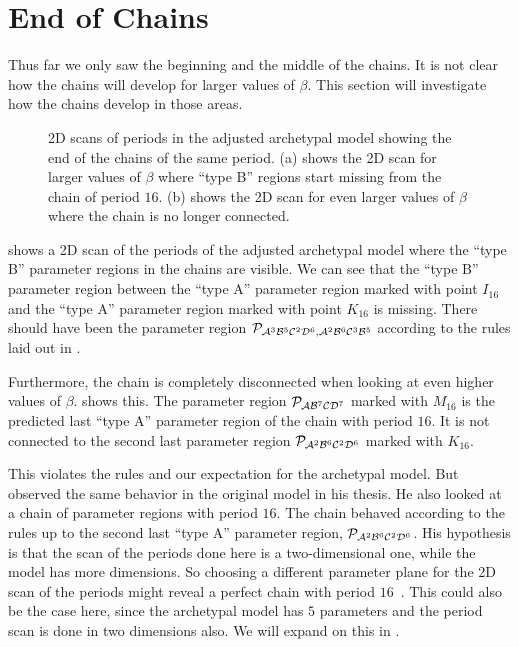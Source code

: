 \section{End of Chains}
\label{sec:arch.end}

Thus far we only saw the beginning and the middle of the chains.
It is not clear how the chains will develop for larger values of $\beta$.
This section will investigate how the chains develop in those areas.

\begin{figure}
	\centering
	\caption[2D scans of periods in the archetypal model showing the end of the chains]{
		2D scans of periods in the adjusted archetypal model showing the end of the chains of the same period.
		(a) shows the 2D scan for larger values of $\beta$ where ``type B'' regions start missing from the chain of period $16$.
		(b) shows the 2D scan for even larger values of $\beta$ where the chain is no longer connected.
	}
\end{figure}

 shows a 2D scan of the periods of the adjusted archetypal model where the ``type B'' parameter regions in the chains are visible.
We can see that the ``type B'' parameter region between the ``type A'' parameter region marked with point $I_{16}$ and the ``type A'' parameter region marked with point $K_{16}$ is missing.
There should have been the parameter region $\mathcal{P}_{\mathcal{A}^3\mathcal{B}^5\mathcal{C}^2\mathcal{D}^6, \mathcal{A}^2\mathcal{B}^6\mathcal{C}^3\mathcal{B}^5}$ according to the rules laid out in .

Furthermore, the chain is completely disconnected when looking at even higher values of $\beta$.
 shows this.
The parameter region $\mathcal{P}_{\mathcal{A}\mathcal{B}^7\mathcal{C}\mathcal{D}^7}$ marked with $M_{16}$ is the predicted last ``type A'' parameter region of the chain with period $16$.
It is not connected to the second last parameter region $\mathcal{P}_{\mathcal{A}^2\mathcal{B}^6\mathcal{C}^2\mathcal{D}^6}$ marked with $K_{16}$.

This violates the rules and our expectation for the archetypal model.
But  observed the same behavior in the original model in his thesis.
He also looked at a chain of parameter regions with period $16$.
The chain behaved according to the rules up to the second last ``type A'' parameter region, $\mathcal{P}_{\mathcal{A}^2\mathcal{B}^6\mathcal{C}^2\mathcal{D}^6}$.
His hypothesis is that the scan of the periods done here is a two-dimensional one, while the model has more dimensions.
So choosing a different parameter plane for the 2D scan of the periods might reveal a perfect chain with period $16$~\cite{akyuz2022}.
This could also be the case here, since the archetypal model has $5$ parameters and the period scan is done in two dimensions also.
We will expand on this in .
